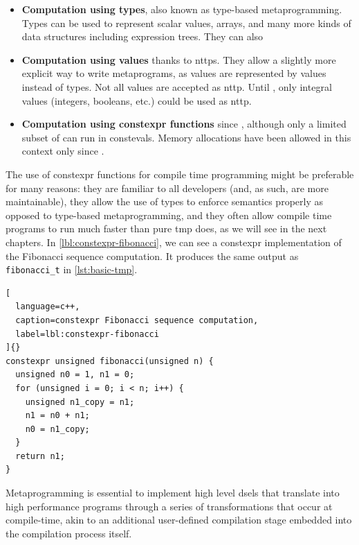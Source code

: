 \documentclass[../main]{subfiles}
\begin{document}
\begin{itemize}

  \item

\textbf{Computation using types}, also known as type-based metaprogramming.
Types can be used to represent scalar values, arrays, and many more
kinds of data structures including expression trees. They can also

  \item

\textbf{Computation using values} thanks to \glspl{nttp}.
They allow a slightly more explicit way to write metaprograms,
as values are represented by values instead of types.
Not all values are accepted as \gls{nttp}.
Until , only integral values (\ie integers, booleans, etc.)
could be used as \gls{nttp}.

  \item

\textbf{Computation using \gls{constexpr} functions} since ,
although only a limited subset of \cpp can run in \glspl{consteval}.
Memory allocations have been allowed in this context only since .

\end{itemize}

The use of \gls{constexpr} functions for compile time programming might be
preferable for many reasons: they are familiar to all \cpp developers
(and, as such, are more maintainable), they allow the use of types to enforce
semantics properly as opposed to type-based metaprogramming, and they often
allow compile time programs to run much faster than pure \gls{tmp} does,
as we will see in the next chapters. In \ref{lbl:constexpr-fibonacci},
we can see a \gls{constexpr} implementation of the Fibonacci sequence
computation. It produces the same output as \lstinline{fibonacci_t} in
\ref{lst:basic-tmp}.

\begin{lstlisting}[
  language=c++,
  caption=constexpr Fibonacci sequence computation,
  label=lbl:constexpr-fibonacci
]{}
constexpr unsigned fibonacci(unsigned n) {
  unsigned n0 = 1, n1 = 0;
  for (unsigned i = 0; i < n; i++) {
    unsigned n1_copy = n1;
    n1 = n0 + n1;
    n0 = n1_copy;
  }
  return n1;
}
\end{lstlisting}

Metaprogramming is essential to implement high level \glspl{dsel} that translate
into high performance programs through a series of transformations that
occur at compile-time, akin to an additional user-defined compilation stage
embedded into the compilation process itself.
\end{document}
